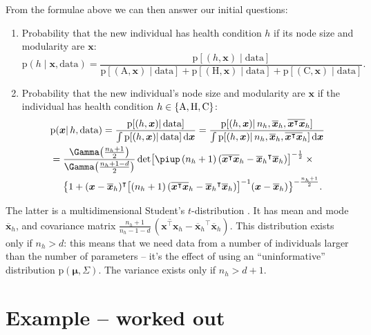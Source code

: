 \documentclass[\ifafour a4paper,12pt,\else a5paper,10pt,\fi%
onecolumn,oneside,article,%
british%
]{memoir}
\theoremstyle{remark}
\theoremstyle{innote}
\renewcommand*{\cites}{\parencites}
\newcommand*{\pu}{\piup}%
\newcommand*{\di}{\mathrm{d}}%
\DeclarePairedDelimiter\set{\{}{\}}
\newcommand*{\pf}{\mathrm{p}}%
\renewcommand*{\|}{\mathpunct{|}}
\newcommand*{\sect}{\S}%
\newcommand*{\sects}{\S\S}%
\newcommand*{\chap}{ch.}%
\newcommand*{\T}{^\intercal}%
\newcommand*{\yH}{h}
\newcommand*{\yx}{x}
\newcommand*{\yxx}{\bm{\yx}}
\newcommand*{\data}{\text{data}}
\newcommand*{\ya}{\mathrm{A}}
\newcommand*{\yi}{\mathrm{C}}
\newcommand*{\yh}{\mathrm{H}}
\newcommand*{\ym}{\mu}
\newcommand*{\ymm}{\bm{\ym}}
\newcommand*{\ys}{\varSigma}
\newcommand*{\yss}{\bm{\ys}}
\newcommand*{\yN}{N}
\newcommand*{\yq}{\pf}
\newcommand*{\yn}{n}
\newcommand*{\yd}{d}
\newcommand*{\yno}{\yn_{\yH}}
\newcommand*{\vxxo}{\overline{\yxx}_{\yH}}
\newcommand*{\vxto}{\overline{\yxx\T\yxx}_{\yH}}
\theoremstyle{plain}
\begin{document}
\bigskip

From the formulae above we can then answer our initial questions:
\begin{enumerate}[wide]
\item Probability that the new individual has health condition $\yH$ if
  its node size and modularity are $\yxx$:
  \begin{equation}
    \label{eq:health_from_fmri_final}
    \pf(\yH \| \yxx, \data)=
    \frac{\pf[(\yH,\yxx) \| \data]
    }{
      \pf[(\ya,\yxx) \| \data]
      +\pf[(\yh,\yxx) \| \data]
      +\pf[(\yi,\yxx) \| \data]
    }.
  \end{equation}
\item Probability that the new individual's node size and modularity are $\yxx$
  if the individual has health condition $\yH\in\set{\ya,\yh,\yi}$:
\begin{multline}
  \label{eq:fmri_from_health_final}
    \pf(\yxx \| \yH, \data)= \frac{\pf[(\yH,\yxx) \| \data]
    }{\int\pf[(\yH,\yxx) \| \data]\,\di\yxx}
    =\frac{\pf[(\yH,\yxx) \| \yno,\vxxo,\vxto]
    }{\int\pf[(\yH,\yxx) \|  \yno,\vxxo,\vxto]\,\di\yxx}
  \\
  =
  \!\begin{aligned}[t]
    &\frac{\Gamma\bigl(\frac{\yno+1}{2}\bigr)
    }{\Gamma\bigl(\frac{\yno+1-\yd}{2}\bigr)} \det\bigl[
    \pu\,(\yno+1)\,(\vxto-{\vxxo}\T\vxxo) \bigr]^{-\frac{1}{2}}
    \times{}\\
    &\bigl\{ 1+(\yxx-\vxxo)\T\bigl[
    (\yno+1)\,(\vxto-{\vxxo}\T\vxxo) \bigr]^{-1} (\yxx-\vxxo)
    \bigr\}^{-\frac{\yno+1}{2}}.
  \end{aligned}
  \end{multline}
\end{enumerate}
The latter is a multidimensional Student's $t$-distribution
\cites[\sects~5,
A]{minka1998_r2001}[\chap~4]{guptaetal2000}[\sect~2.5.3]{murphy2012}[p.~139]{bernardoetal1994_r2000}[\sect~2.3.7]{bishop2006}[\sect~5.6]{degroot1970_r2004}.
It has mean and mode $\vxxo$, and covariance matrix
$\frac{\yno+1}{\yno-1-\yd}\,(\vxto-{\vxxo}\T\vxxo)$. This
distribution exists only if $\yno>\yd$: this means that we need data from a
number of individuals larger than the number of parameters -- it's the
effect of using an \enquote{uninformative} distribution $\yq(\ymm,\yss)$.
The variance exists only if $\yno>\yd+1$.



\section{Example -- worked out}
\label{sec:example_worked}
\end{document}
